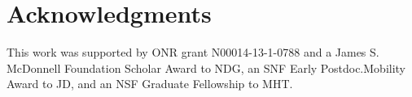 \documentclass[10pt,letterpaper]{article}
\newcommand{\red}[1]{\textcolor{Red}{#1}}
\begin{document}
%
%

\section{Acknowledgments}

This work was supported by ONR grant N00014-13-1-0788 and a James S. McDonnell Foundation Scholar Award to NDG, an SNF Early Postdoc.Mobility Award to JD, and an NSF Graduate Fellowship to MHT.

\small




\setlength{\bibleftmargin}{.125in}
\setlength{\bibindent}{-\bibleftmargin}


\end{document}
